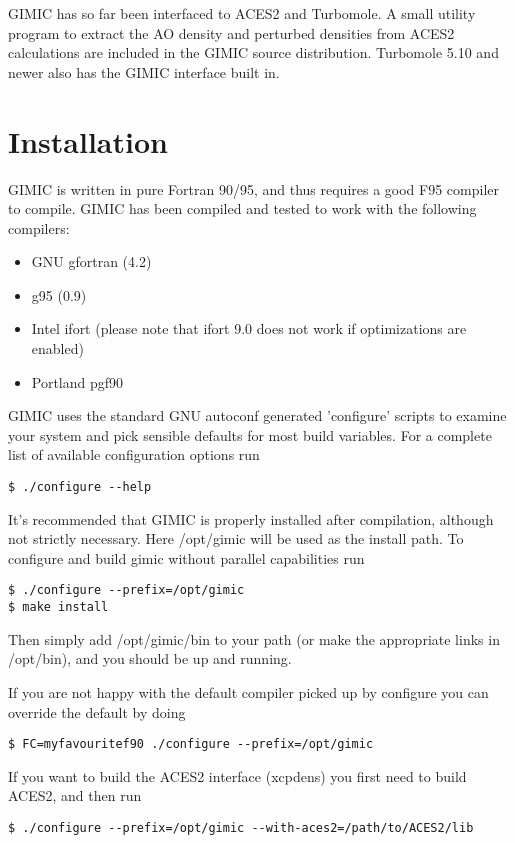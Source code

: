 \documentclass[a4paper,11pt]{article}
\begin{document}
GIMIC has so far been interfaced to ACES2 and Turbomole. A small utility
program to extract the AO density and perturbed densities from ACES2
calculations are included in the GIMIC source distribution. Turbomole 5.10 and
newer also has the GIMIC interface built in. 

\section{Installation}
GIMIC is written in pure Fortran 90/95, and thus requires a good F95 compiler
to compile. GIMIC has been compiled and tested to work with the following
compilers: 
\begin{itemize}
  \item GNU gfortran (4.2) 
  \item g95 (0.9)
  \item Intel ifort (please note that ifort 9.0 does not work if optimizations
	are enabled)
  \item Portland pgf90
\end{itemize}

GIMIC uses the standard GNU autoconf generated 'configure' scripts to examine
your system and pick sensible defaults for most build variables. For a
complete list of available configuration options run
\begin{verbatim}
$ ./configure --help
\end{verbatim}

It's recommended that GIMIC is properly installed after compilation, although
not strictly necessary. Here /opt/gimic will be used as the install path. To
configure and build gimic without parallel capabilities run 
\begin{verbatim}
$ ./configure --prefix=/opt/gimic 
$ make install
\end{verbatim}

Then simply add /opt/gimic/bin to your path (or make the appropriate links in
/opt/bin), and you should be up and running. 

If you are not happy with the default compiler picked up by configure you can
override the default by doing
\begin{verbatim}
$ FC=myfavouritef90 ./configure --prefix=/opt/gimic
\end{verbatim}
 
If you want to build the ACES2 interface (xcpdens) you first need to build
ACES2, and then run
\begin{verbatim}
$ ./configure --prefix=/opt/gimic --with-aces2=/path/to/ACES2/lib
\end{verbatim}
\end{document}
